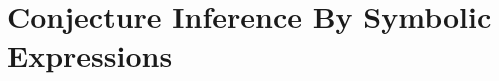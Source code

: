 
\section{Conjecture Inference By Symbolic Expressions}
\label{thesy:screening}

\begin{comment}
Storytelling
\begin{itemize}
    \item Difficulty
        \begin{itemize}
            \item exponential number of terms
            \item n of eq. is quadratic in number of terms
            \item checking equality is generally undecidable, and at any rate, expensive
                 (require induction)
            \item assume no base values (only ADT ctors)
                  --- cannot infer on uninterpreted / non-concrete (recursive) values
        \end{itemize}
    \item Journey
        \begin{itemize}
            \item Use PEG to compactly represent a space of terms, later we will see
              how to explore all conjectures efficiently using memoization
            \item equalities are formed not by testing all pairs, but via equivalence
              reduction; furthermore, equalities that evidently cannot be proved by
              simple induction are pruned away
            \item the equivalence relation is defined symbolically so that it can be
              computed for unknown/incomplete values
            \item inferred rules are used to further prune the space of terms by
              collapsing equivalence classes during iterative deepening.
            \item (the use of PEG helps discover common expressions during symbolic
              evaluation on example values)
        \end{itemize}
\end{itemize}


This section is all about showing 2 problems.
\begin{enumerate}
    \item There are a lot of terms and we want to save on edges
    \item There are even more equality terms and we want to filter to possible ones
\end{enumerate}

Terms as edges of terms to show subliniarity
Mention that by only checking terms and not equality terms there are quardeupaly less terms

\ldots
\end{comment}

